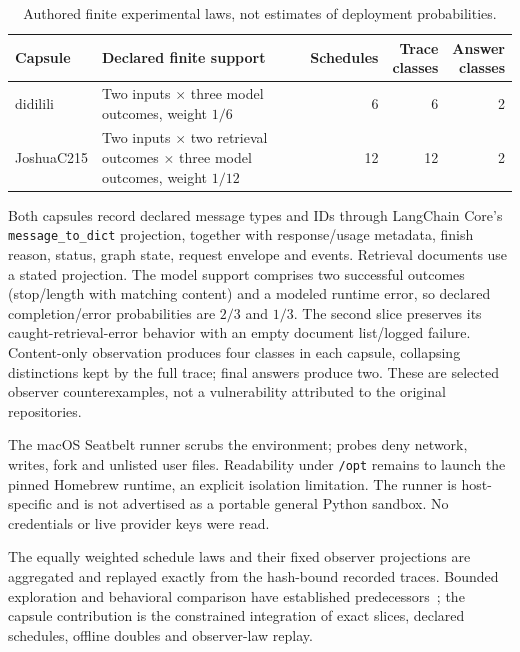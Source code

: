 \documentclass[11pt,a4paper]{article}
\newcommand{\cp}[1]{\nolinkurl{#1}}
\begin{document}
\begin{table}[h]
\small
\begin{tabularx}{\textwidth}{@{}l >{\raggedright\arraybackslash}X r r r@{}}
\toprule
Capsule & Declared finite support & Schedules & \shortstack{Trace\\classes} & \shortstack{Answer\\classes} \\
\midrule
didilili & Two inputs $\times$ three model outcomes, weight $1/6$ & 6 & 6 & 2 \\
JoshuaC215 & Two inputs $\times$ two retrieval outcomes $\times$ three model outcomes, weight $1/12$ & 12 & 12 & 2 \\
\bottomrule
\end{tabularx}
\caption{Authored finite experimental laws, not estimates of deployment probabilities.}
\end{table}

Both capsules record declared message types and IDs through LangChain Core's \cp{message_to_dict} projection, together with response/usage metadata, finish reason, status, graph state, request envelope and events. Retrieval documents use a stated projection. The model support comprises two successful outcomes (stop/length with matching content) and a modeled runtime error, so declared completion/error probabilities are $2/3$ and $1/3$. The second slice preserves its caught-retrieval-error behavior with an empty document list/logged failure. Content-only observation produces four classes in each capsule, collapsing distinctions kept by the full trace; final answers produce two. These are selected observer counterexamples, not a vulnerability attributed to the original repositories.

The macOS Seatbelt runner scrubs the environment; probes deny network, writes, fork and unlisted user files. Readability under \cp{/opt} remains to launch the pinned Homebrew runtime, an explicit isolation limitation. The runner is host-specific and is not advertised as a portable general Python sandbox. No credentials or live provider keys were read.

The equally weighted schedule laws and their fixed observer projections are aggregated and replayed exactly from the hash-bound recorded traces. Bounded exploration and behavioral comparison have established predecessors~\cite{bmc,dart,differential}; the capsule contribution is the constrained integration of exact slices, declared schedules, offline doubles and observer-law replay.
\end{document}
